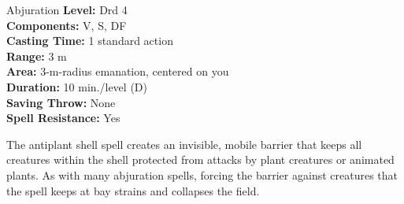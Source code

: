{Abjuration}
{
	\textbf{Level:}
	Drd 4\\
	\textbf{Components:}
	V, S, DF\\
	\textbf{Casting Time:}
	1 standard action\\
	\textbf{Range:}
	3 m\\
	\textbf{Area:}
	3-m-radius emanation, centered on you\\
	\textbf{Duration:}
	10 min./level (D)\\
	\textbf{Saving Throw:}
	None\\
	\textbf{Spell Resistance:}
	Yes\\
}
{
	The antiplant shell spell creates an invisible, mobile barrier that keeps all creatures within the shell protected from attacks by plant creatures or animated plants. As with many abjuration spells, forcing the barrier against creatures that the spell keeps at bay strains and collapses the field.

}
